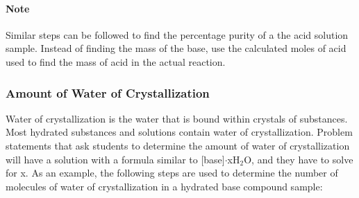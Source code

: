 \paragraph{Note} Similar steps can be followed to find the percentage purity of a the acid solution sample. Instead of finding the mass of the base, use the calculated moles of acid used to find the mass of acid in the actual reaction.

\subsubsection{Amount of Water of Crystallization}

Water of crystallization is the water that is bound within crystals of substances. Most hydrated substances and solutions contain water of crystallization. Problem statements that ask students to determine the amount of water of crystallization will have a solution with a formula similar to [base]$\cdot$xH$_2$O, and they have to solve for x. As an example, the following steps are used to determine the number of molecules of water of crystallization in a hydrated base compound sample:

